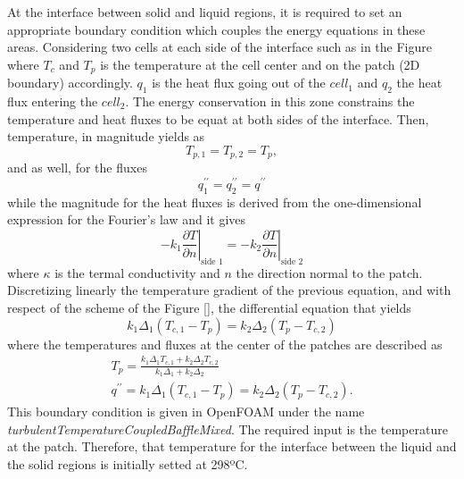At the interface between solid and liquid regions, it is required to set an appropriate boundary condition which couples the energy equations in these areas.
\newline
Considering two cells at each side of the interface such as in the Figure
\newline
where $T_c$ and $T_p$ is the temperature at the cell center and on the patch (2D boundary) accordingly. $q_1$ is the heat flux going out of the $cell_1$ and $q_2$ the heat flux entering the $cell_2$. The energy conservation in this zone constrains the temperature and heat fluxes to be equat at both sides of the interface. 
Then, temperature, in magnitude yields as
\begin{equation}
	T_{p, 1}=T_{p, 2}=T_{p},
	\label{4.9}
\end{equation}
and as well, for the fluxes
\begin{equation}
	q_{1}^{\prime \prime}=q_{2}^{\prime \prime}=q^{\prime \prime}
	\label{4.10}
\end{equation}
while the magnitude for the heat fluxes is derived from the one-dimensional expression for the Fourier's law and it gives
\begin{equation}
	-\left.k_{1} \frac{\partial T}{\partial n}\right|_{\text {side } 1}=-\left.k_{2} \frac{\partial T}{\partial n}\right|_{\text {side } 2}
	\label{4.11}
\end{equation}
where $\kappa$ is the termal conductivity and $n$ the direction normal to the patch.
Discretizing linearly the temperature gradient of the previous equation, and with respect of the scheme of the Figure [], the differential equation that yields 
\begin{equation}
	k_{1} \Delta_{1}\left(T_{c, 1}-T_{p}\right)=k_{2} \Delta_{2}\left(T_{p}-T_{c, 2}\right)
	\label{4.12}
\end{equation}
where the temperatures and fluxes at the center of the patches are described as
\begin{equation}
	\begin{gathered}
	T_{p}=\frac{k_{1} \Delta_{1} T_{c, 1}+k_{2} \Delta_{2} T_{c, 2}}{k_{1} \Delta_{1}+k_{2} \Delta_{2}} \\
	q^{\prime \prime}=k_{1} \Delta_{1}\left(T_{c, 1}-T_{p}\right)=k_{2} \Delta_{2}\left(T_{p}-T_{c, 2}\right) .
	\end{gathered}
	\label{4.13}
\end{equation}
This boundary condition is given in OpenFOAM under the name \textit{turbulentTemperatureCoupledBaffleMixed}. The required input is the temperature at the patch. Therefore, that temperature for the interface between the liquid and the solid regions is initially setted at 298ºC.
